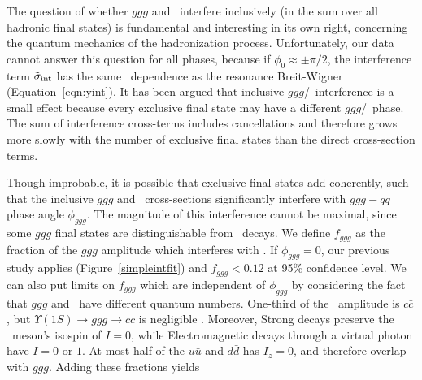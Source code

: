 \documentclass{cornell}
\begin{document}
The question of whether $ggg$ and \qqbar\ interfere inclusively (in
the sum over all hadronic final states) is fundamental and interesting
in its own right, concerning the quantum mechanics of the
hadronization process.  Unfortunately, our data cannot answer this
question for all phases, because if $\phi_0 \approx \pm \pi/2$, the
interference term $\tilde{\sigma}_{\mbox{\scriptsize int}}$ has the same \ecm\
dependence as the resonance Breit-Wigner (Equation~\ref{eqn:yint}).
It has been argued \cite{yan} that inclusive $ggg$/\qqbar\ interference
is a small effect because every exclusive final state may have a
different $ggg$/\qqbar\ phase.  The sum of interference cross-terms
includes cancellations and therefore grows more slowly with the number
of exclusive final states than the direct cross-section terms.

Though improbable, it is possible that exclusive final states add
coherently, such that the inclusive $ggg$ and \qqbar\ cross-sections
significantly interfere with $ggg - q\bar{q}$ phase angle
$\phi_{ggg}$.  The magnitude of this interference cannot be maximal,
since some $ggg$ final states are distinguishable from \qqbar\ decays.
We define $f_{ggg}$ as the fraction of the $ggg$ amplitude which
interferes with \qqbar.  If $\phi_{ggg}=0$, our previous study applies
(Figure~\ref{simpleintfit}) and $f_{ggg} < 0.12$ at 95\% confidence
level.  We can also put limits on $f_{ggg}$ which are independent of
$\phi_{ggg}$ by considering the fact that $ggg$ and \qqbar\ have
different quantum numbers.  One-third of the \qqbar\ amplitude is
$c\bar{c}$, but $\Upsilon(1S) \to ggg \to c\bar{c}$ is negligible
\cite{watkins}.  Moreover, Strong decays preserve the \ups\ meson's
isospin of $I=0$, while Electromagnetic decays through a virtual
photon have $I=0$ or $1$.  At most half of the $u\bar{u}$ and
$d\bar{d}$ has $I_z=0$, and therefore overlap with $ggg$.  Adding
these fractions yields
\end{document}
